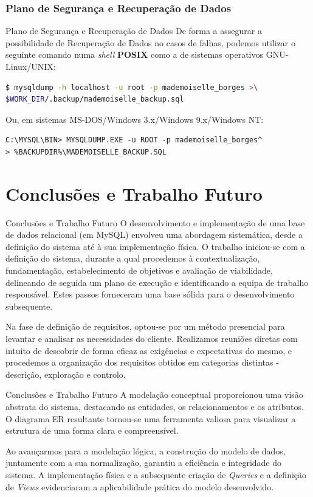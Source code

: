 \documentclass[compress,svgnames,handout,13.7pt]{beamer}
\begin{document}
\subsubsection{Plano de Seguran\c{c}a e Recupera\c{c}\~{a}o de Dados}
\begin{frame}[fragile]{Plano de Seguran\c{c}a e Recupera\c{c}\~{a}o de Dados}
De forma a assegurar a possibilidade de Recuperação de Dados no casos de falhas, podemos utilizar o seguinte
comando numa \textit{shell} \textbf{POSIX} como a de sistemas operativos GNU-Linux/UNIX:
\begin{lstlisting}[language=bash, basicstyle=\small]
$ mysqldump -h localhost -u root -p mademoiselle_borges >\ 
$WORK_DIR/.backup/mademoiselle_backup.sql
\end{lstlisting}
Ou, em sistemas MS-DOS/Windows 3.x/Windows 9.x/Windows NT:
\begin{lstlisting}[basicstyle=\small]
C:\MYSQL\BIN> MYSQLDUMP.EXE -u ROOT -p mademoiselle_borges^
> %BACKUPDIR%\MADEMOISELLE_BACKUP.SQL 
\end{lstlisting}
\end{frame}

\section{Conclus\~{o}es e Trabalho Futuro}
\begin{frame}{Conclus\~{o}es e Trabalho Futuro}
    O desenvolvimento e implementação de uma base de dados relacional (em MySQL) envolveu uma abordagem sistemática, 
    desde a definição do sistema até à sua implementação física. O trabalho iniciou-se com a definição
    do sistema, durante a qual procedemos à contextualização, fundamentação, estabelecimento de objetivos
    e avaliação de viabilidade, delineando de seguida um plano de execução e identificando a equipa 
    de trabalho responsável. Estes passos forneceram uma base sólida para o desenvolvimento subsequente.

    Na fase de definição de requisitos, optou-se por um método presencial para levantar e analisar
    as necessidades do cliente. Realizamos reuniões diretas com intuito de descobrir de forma 
    eficaz as exigências e expectativas do mesmo, e procedemos a organização dos requisitos
    obtidos em categorias distintas - descrição, exploração e controlo.
\end{frame}

\begin{frame}{Conclus\~{o}es e Trabalho Futuro}
    A modelação conceptual proporcionou uma visão abstrata do sistema, destacando as entidades,
    os relacionamentos e os atributos. O diagrama ER resultante tornou-se uma ferramenta 
    valiosa para visualizar a estrutura de uma forma clara e compreensível.

    Ao avançarmos para a modelação lógica, a construção do modelo de dados, juntamente 
    com a sua normalização, garantiu a eficiência e integridade do sistema. A implementação física e a subsequente criação 
    de \textit{Queries} e a definição de \textit{Views} evidenciaram a aplicabilidade prática do modelo desenvolvido.
\end{frame}
\end{document}
